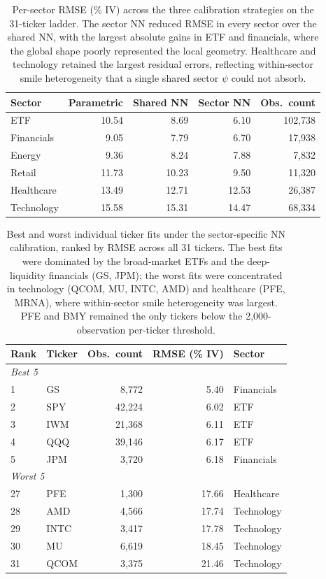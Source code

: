 \begin{table}[ht]
\centering
\caption{Per-sector RMSE (\% IV) across the three calibration strategies on the 31-ticker ladder. The sector NN reduced RMSE in every sector over the shared NN, with the largest absolute gains in ETF and financials, where the global shape poorly represented the local geometry. Healthcare and technology retained the largest residual errors, reflecting within-sector smile heterogeneity that a single shared sector $\psi$ could not absorb.}\label{tab:per_sector}
\begin{tabular}{lrrrr}
\toprule
Sector & Parametric & Shared NN & Sector NN & Obs.\ count \\
\midrule
ETF        & 10.54 &  8.69 &  6.10 & 102{,}738 \\
Financials &  9.05 &  7.79 &  6.70 &  17{,}938 \\
Energy     &  9.36 &  8.24 &  7.88 &   7{,}832 \\
Retail     & 11.73 & 10.23 &  9.50 &  11{,}320 \\
Healthcare & 13.49 & 12.71 & 12.53 &  26{,}387 \\
Technology & 15.58 & 15.31 & 14.47 &  68{,}334 \\
\bottomrule
\end{tabular}
\end{table}

\begin{table}[ht]
\centering
\caption{Best and worst individual ticker fits under the sector-specific NN calibration, ranked by RMSE across all 31 tickers. The best fits were dominated by the broad-market ETFs and the deep-liquidity financials (GS, JPM); the worst fits were concentrated in technology (QCOM, MU, INTC, AMD) and healthcare (PFE, MRNA), where within-sector smile heterogeneity was largest. PFE and BMY remained the only tickers below the 2{,}000-observation per-ticker threshold.}\label{tab:worst_tickers}
\begin{tabular}{llrrl}
\toprule
Rank & Ticker & Obs.\ count & RMSE (\% IV) & Sector \\
\midrule
\multicolumn{5}{l}{\emph{Best 5}} \\
 1 & GS   &  8{,}772 & 5.40 & Financials \\
 2 & SPY  & 42{,}224 & 6.02 & ETF \\
 3 & IWM  & 21{,}368 & 6.11 & ETF \\
 4 & QQQ  & 39{,}146 & 6.17 & ETF \\
 5 & JPM  &  3{,}720 & 6.18 & Financials \\
\midrule
\multicolumn{5}{l}{\emph{Worst 5}} \\
27 & PFE  &  1{,}300 & 17.66 & Healthcare \\
28 & AMD  &  4{,}566 & 17.74 & Technology \\
29 & INTC &  3{,}417 & 17.78 & Technology \\
30 & MU   &  6{,}619 & 18.45 & Technology \\
31 & QCOM &  3{,}375 & 21.46 & Technology \\
\bottomrule
\end{tabular}
\end{table}

